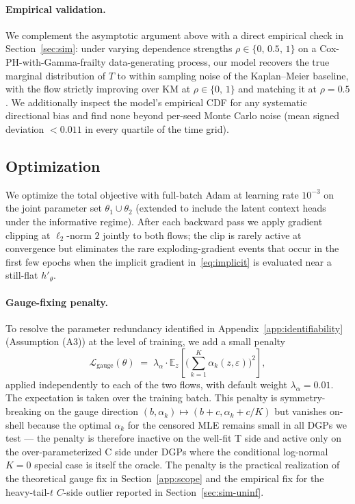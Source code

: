 \paragraph{Empirical validation.}
We complement the asymptotic argument above with a direct empirical check
in Section~\ref{sec:sim}: under varying dependence strengths
$\rho \in \{0,\, 0.5,\, 1\}$ on a Cox-PH-with-Gamma-frailty
data-generating process, our model recovers the true marginal distribution
of $T$ to within sampling noise of the Kaplan--Meier baseline, with the
flow strictly improving over KM at $\rho \in \{0,\, 1\}$ and matching it at
$\rho = 0.5$. We additionally inspect the model's empirical CDF for any
systematic directional bias and find none beyond per-seed Monte Carlo
noise (mean signed deviation $< 0.011$ in every quartile of the time
grid).

\subsection{Optimization}
\label{sec:opt}

We optimize the total objective with full-batch Adam at learning rate
$10^{-3}$ on the joint parameter set $\theta_1 \cup \theta_2$ (extended to
include the latent context heads under the informative regime). After
each backward pass we apply gradient clipping at $\ell_2$-norm $2$
jointly to both flows; the clip is rarely active at convergence but
eliminates the rare exploding-gradient events that occur in the first
few epochs when the implicit gradient in~\eqref{eq:implicit} is
evaluated near a still-flat $h'_\theta$.

\paragraph{Gauge-fixing penalty.}
To resolve the parameter redundancy identified in
Appendix~\ref{app:identifiability} (Assumption (A3)) at the level of
training, we add a small penalty
\begin{equation}
    \mathcal{L}_{\text{gauge}}(\theta)
    \;=\; \lambda_\alpha \cdot
    \mathbb{E}_z\!\left[\Big(\sum_{k=1}^{K} \alpha_k(z, \varepsilon)\Big)^2\right],
    \label{eq:gauge}
\end{equation}
applied independently to each of the two flows, with default weight
$\lambda_\alpha = 0.01$. The expectation is taken over the training
batch. This penalty is symmetry-breaking on the gauge direction
$(b, \alpha_k) \mapsto (b + c, \alpha_k + c/K)$ but vanishes on-shell
because the optimal $\alpha_k$ for the censored MLE remains small in all
DGPs we test --- the penalty is therefore inactive on the well-fit T
side and active only on the over-parameterized C side under DGPs where
the conditional log-normal $K = 0$ special case is itself the oracle.
The penalty is the practical realization of the theoretical gauge fix in
Section~\ref{app:scope} and the empirical fix for the heavy-tail-$t$
$C$-side outlier reported in Section~\ref{sec:sim-uninf}.

